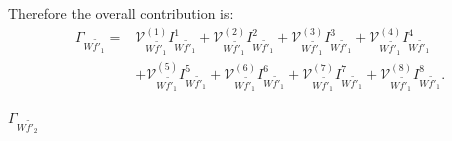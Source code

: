\documentclass[final,3p,times,pdflatex]{elsarticle}
\begin{document}
Therefore the overall contribution is:
\begin{equation} 
\begin{aligned}
\Gamma_{W \tilde{f'}_1} = & \mathcal{V}_{W \tilde{f'}_1}^{(1)} I_{W \tilde{f'}_1}^{1} + \mathcal{V}_{W \tilde{f'}_1}^{(2)} I_{W \tilde{f'}_1}^{2} + \mathcal{V}_{W \tilde{f'}_1}^{(3)} I_{W \tilde{f'}_1}^{3} + \mathcal{V}_{W \tilde{f'}_1}^{(4)} I_{W \tilde{f'}_1}^{4} \\ & + \mathcal{V}_{W \tilde{f'}_1}^{(5)} I_{W \tilde{f'}_1}^{5} + \mathcal{V}_{W \tilde{f'}_1}^{(6)} I_{W \tilde{f'}_1}^{6} + \mathcal{V}_{W \tilde{f'}_1}^{(7)} I_{W \tilde{f'}_1}^{7} + \mathcal{V}_{W \tilde{f'}_1}^{(8)} I_{W \tilde{f'}_1}^{8}.
\end{aligned}
\end{equation}

\textbf{\underline{$\Gamma_{W \tilde{f'}_2}$}}
\end{document}
